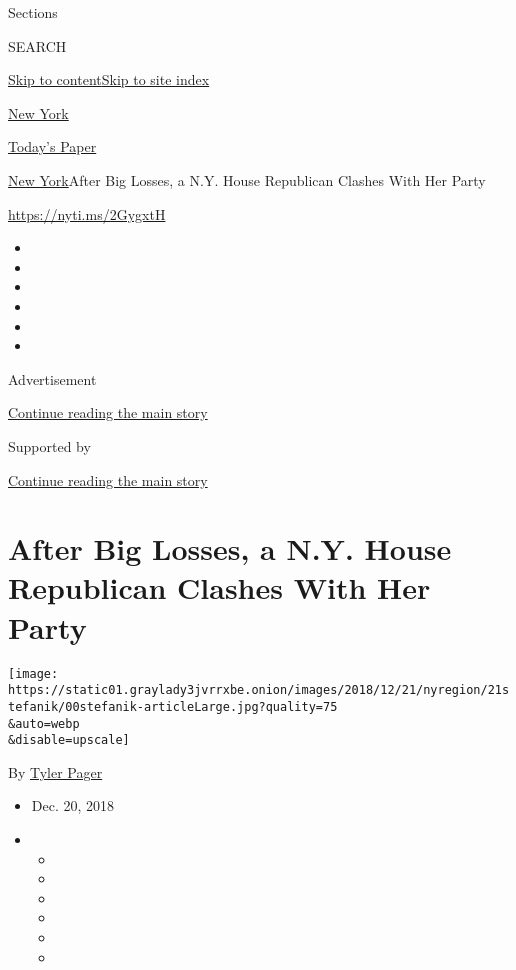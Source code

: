 Sections

SEARCH

\protect\hyperlink{site-content}{Skip to
content}\protect\hyperlink{site-index}{Skip to site index}

\href{https://www.nytimes3xbfgragh.onion/section/nyregion}{New York}

\href{https://myaccount.nytimes3xbfgragh.onion/auth/login?response_type=cookie\&client_id=vi}{}

\href{https://www.nytimes3xbfgragh.onion/section/todayspaper}{Today's
Paper}

\href{/section/nyregion}{New York}\textbar{}After Big Losses, a N.Y.
House Republican Clashes With Her Party

\url{https://nyti.ms/2GygxtH}

\begin{itemize}
\item
\item
\item
\item
\item
\item
\end{itemize}

Advertisement

\protect\hyperlink{after-top}{Continue reading the main story}

Supported by

\protect\hyperlink{after-sponsor}{Continue reading the main story}

\hypertarget{after-big-losses-a-ny-house-republican-clashes-with-her-party}{%
\section{After Big Losses, a N.Y. House Republican Clashes With Her
Party}\label{after-big-losses-a-ny-house-republican-clashes-with-her-party}}

\texttt{[image: https://static01.graylady3jvrrxbe.onion/images/2018/12/21/nyregion/21stefanik/00stefanik-articleLarge.jpg?quality=75\\\&auto=webp\\\&disable=upscale]}

By \href{https://www.nytimes3xbfgragh.onion/by/tyler-pager}{Tyler Pager}

\begin{itemize}
\item
  Dec. 20, 2018
\item
  \begin{itemize}
  \item
  \item
  \item
  \item
  \item
  \item
  \end{itemize}
\end{itemize}

